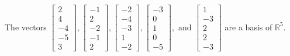 \begin{exercise}
\begin{exerciseStatement}
  \end{exerciseStatement}
  \begin{exerciseAnswer}
   The vectors \(\left[\begin{array}{r}
2 \\
4 \\
-4 \\
-5 \\
3
\end{array}\right] , \left[\begin{array}{r}
-1 \\
2 \\
-2 \\
-1 \\
2
\end{array}\right] , \left[\begin{array}{r}
-2 \\
-4 \\
-3 \\
1 \\
-2
\end{array}\right] , \left[\begin{array}{r}
-3 \\
0 \\
1 \\
0 \\
-5
\end{array}\right] , \text{ and } \left[\begin{array}{r}
1 \\
-3 \\
2 \\
2 \\
-3
\end{array}\right]\) 
  	 are  a basis of \(\mathbb{R}^5\).
  


  \end{exerciseAnswer}
\end{exercise}
